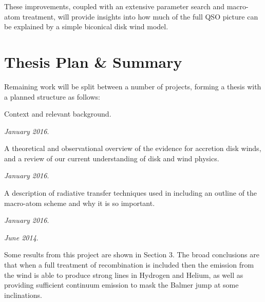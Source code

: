\documentclass[useAMS,usenatbib,onecolumn]{mn2e2}
\begin{document}
These improvements, coupled with an extensive parameter search and macro-atom treatment, 
will provide insights into how much of the full QSO picture can be explained by a simple biconical disk wind model.





%
%

\newpage
\section{Thesis Plan \& Summary}
\label{future}
\noindent Remaining work will be split between a number of projects, forming a thesis with a planned structure as follows:

\bigskip


 Context and relevant background. 

  {\sl January 2016}.

\bigskip

 A theoretical and observational overview of the evidence for accretion disk winds, and a review of our current understanding of disk and wind physics. 

  {\sl January 2016}.

\bigskip

 A description of radiative transfer techniques used in \py including an outline of the macro-atom scheme and why it is so important.

  {\sl January 2016}.

\bigskip


  {\sl June 2014}. 

 Some results from this project are shown in Section 3. The broad conclusions are that when a full treatment of recombination is included then the emission from the wind is able to produce strong lines in Hydrogen and Helium, as well as providing 
sufficient continuum emission to mask the Balmer jump at some inclinations.
\end{document}

